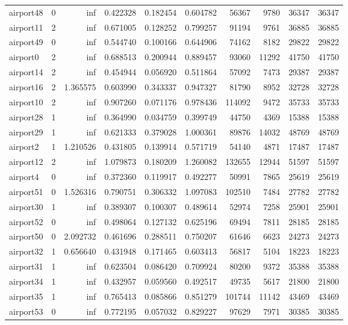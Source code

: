 \begin{longtable}{|l|r|r|r|r|r|r|r|r|r|}
airport48 & 0 & inf & 0.422328 & 0.182454 & 0.604782 & 56367 & 9780 & 36347 & 36347 \\
airport11 & 2 & inf & 0.671005 & 0.128252 & 0.799257 & 91194 & 9761 & 36885 & 36885 \\
airport49 & 0 & inf & 0.544740 & 0.100166 & 0.644906 & 74162 & 8182 & 29822 & 29822 \\
airport0 & 2 & inf & 0.688513 & 0.200944 & 0.889457 & 93060 & 11292 & 41750 & 41750 \\
airport14 & 2 & inf & 0.454944 & 0.056920 & 0.511864 & 57092 & 7473 & 29387 & 29387 \\
airport16 & 2 & 1.365575 & 0.603990 & 0.343337 & 0.947327 & 81790 & 8952 & 32728 & 32728 \\
airport10 & 2 & inf & 0.907260 & 0.071176 & 0.978436 & 114092 & 9472 & 35733 & 35733 \\
airport28 & 1 & inf & 0.364990 & 0.034759 & 0.399749 & 44750 & 4369 & 15388 & 15388 \\
airport29 & 1 & inf & 0.621333 & 0.379028 & 1.000361 & 89876 & 14032 & 48769 & 48769 \\
airport2 & 1 & 1.210526 & 0.431805 & 0.139914 & 0.571719 & 54140 & 4871 & 17487 & 17487 \\
airport12 & 2 & inf & 1.079873 & 0.180209 & 1.260082 & 132655 & 12944 & 51597 & 51597 \\
airport4 & 0 & inf & 0.372360 & 0.119917 & 0.492277 & 50991 & 7865 & 25619 & 25619 \\
airport51 & 0 & 1.526316 & 0.790751 & 0.306332 & 1.097083 & 102510 & 7484 & 27782 & 27782 \\
airport30 & 1 & inf & 0.389307 & 0.100307 & 0.489614 & 52974 & 7258 & 25901 & 25901 \\
airport52 & 0 & inf & 0.498064 & 0.127132 & 0.625196 & 69494 & 7811 & 28185 & 28185 \\
airport50 & 0 & 2.092732 & 0.461696 & 0.288511 & 0.750207 & 61646 & 6623 & 24273 & 24273 \\
airport32 & 1 & 0.656640 & 0.431948 & 0.171465 & 0.603413 & 56817 & 5104 & 18223 & 18223 \\
airport31 & 1 & inf & 0.623504 & 0.086420 & 0.709924 & 80200 & 9372 & 35388 & 35388 \\
airport34 & 1 & inf & 0.432957 & 0.059560 & 0.492517 & 49735 & 5617 & 21800 & 21800 \\
airport35 & 1 & inf & 0.765413 & 0.085866 & 0.851279 & 101744 & 11142 & 43469 & 43469 \\
airport53 & 0 & inf & 0.772195 & 0.057032 & 0.829227 & 97629 & 7971 & 30385 & 30385 \\

\end{longtable}
